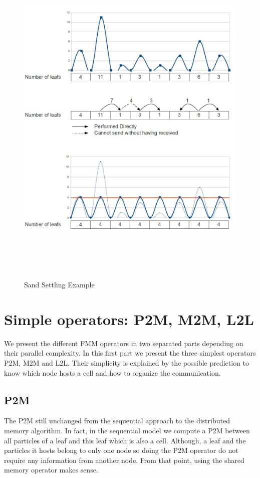 \documentclass[12pt,letterpaper,titlepage]{report}
\begin{document}
\begin{figure}[h!]
\begin{center}
\includegraphics[width=14cm, height=17cm, keepaspectratio=true]{SandSettling.png}
\caption{Sand Settling Example}
\end{center}
\end{figure}
\chapter{Simple operators: P2M, M2M, L2L}
We present the different FMM operators in two separated parts depending on their parallel complexity.
In this first part we present the three simplest operators P2M, M2M and L2L.
Their simplicity is explained by the possible prediction to know which node hosts a cell and how to organize the communication.
\section{P2M}
The P2M still unchanged from the sequential approach to the distributed memory algorithm.
In fact, in the sequential model we compute a P2M between all particles of a leaf and this leaf which is also a cell.
Although, a leaf and the particles it hosts belong to only one node so doing the P2M operator do not require any information from another node.
From that point, using the shared memory operator makes sense.
\end{document}
